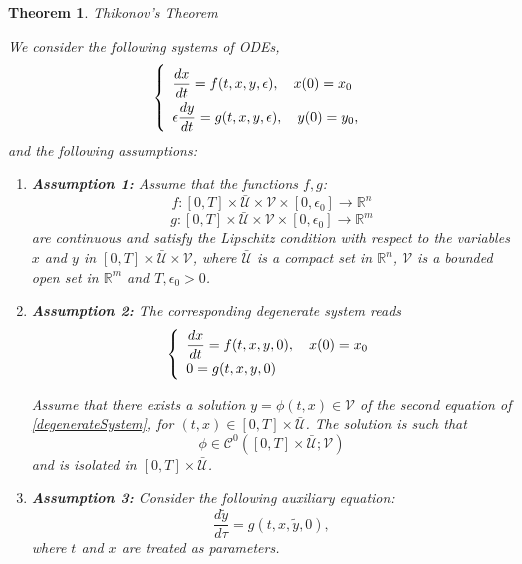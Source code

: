 \documentclass{article}
\newtheorem{theorem}{Theorem}
\begin{document}
\begin{theorem} Thikonov's Theorem \cite{banasiak_methods_2014} \label{theorem:Tikhonov}

We consider the following systems of ODEs,
\begin{equation}\label{orginalProbelm}
\def\arraystretch{2}
\left\lbrace \begin{array}{l}
\dfrac{d x}{dt} = f(t,x,y,\epsilon), \quad x(0) = x_0 \\
\epsilon \dfrac{d y}{dt} = g(t,x,y,\epsilon), \quad y(0) = y_0, \\
\end{array} \right.
\end{equation}and the following assumptions:
\begin{enumerate}
\item \textbf{Assumption 1:} Assume that the functions $f, g$:
$$
f : [0, T]\times \mathcal{\bar{U}} \times \mathcal{V} \times [0, \epsilon_0] \rightarrow \mathbb{R}^n
$$
$$
g : [0, T]\times \mathcal{\bar{U}} \times \mathcal{V} \times [0, \epsilon_0] \rightarrow \mathbb{R}^m
$$
are continuous and satisfy the Lipschitz condition with respect to the variables $x$ and $y$ in $[0, T]\times \mathcal{\bar{U}} \times \mathcal{V}$, where $\mathcal{\bar{U}}$ is a compact set in $\mathbb{R}^n$, $\mathcal{V}$ is a bounded open set in $\mathbb{R}^m$ and $T, \epsilon_0 > 0$.
\item \textbf{Assumption 2:} The corresponding degenerate system reads
\begin{equation} \label{degenerateSystem}
\def\arraystretch{1.2}
\left\lbrace \begin{array}{l}
\dfrac{d x}{dt} = f(t,x,y,0), \quad x(0) = x_0 \\
0 =  g(t,x,y,0)
\end{array} \right.
\end{equation}

Assume that there exists a solution $y = \phi(t, x) \in \mathcal{V}$ of the second equation of \eqref{degenerateSystem}, for $(t,x) \in [0, T]\times \mathcal{\bar{U}}$. The solution is such that
$$
\phi \in \mathcal{C}^0([0, T]\times \mathcal{\bar{U}} ; \mathcal{V})
$$
and is isolated in $[0, T]\times \mathcal{\bar{U}}$.
\item \textbf{Assumption 3:} Consider the following auxiliary equation:
\begin{equation}\label{auxiliaryEquation}
\dfrac{d \tilde{y}}{d \tau} =  g(t,x,\tilde{y},0),
\end{equation}
where $t$ and $x$ are treated as parameters.


\end{enumerate}
\end{theorem}
\end{document}
